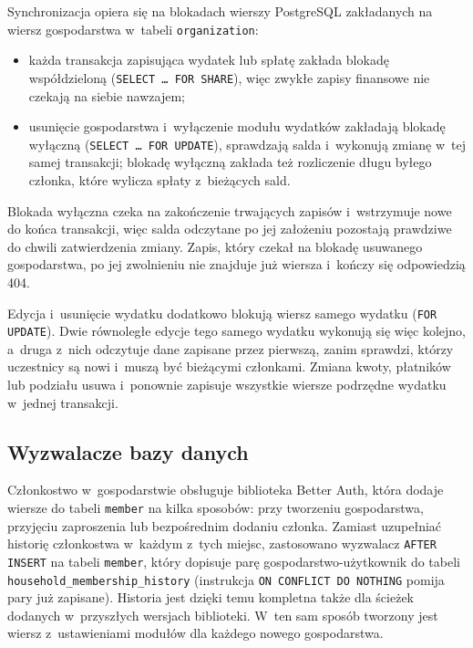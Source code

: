 Synchronizacja opiera się na blokadach wierszy PostgreSQL zakładanych na wiersz gospodarstwa w~tabeli \texttt{organization}:

\begin{itemize}
  \item każda transakcja zapisująca wydatek lub spłatę zakłada blokadę współdzieloną (\texttt{SELECT \dots{} FOR SHARE}), więc zwykłe zapisy finansowe nie czekają na siebie nawzajem;
  \item usunięcie gospodarstwa i~wyłączenie modułu wydatków zakładają blokadę wyłączną (\texttt{SELECT \dots{} FOR UPDATE}), sprawdzają salda i~wykonują zmianę w~tej samej transakcji; blokadę wyłączną zakłada też rozliczenie długu byłego członka, które wylicza spłaty z~bieżących sald.
\end{itemize}

Blokada wyłączna czeka na zakończenie trwających zapisów i~wstrzymuje nowe do końca transakcji, więc salda odczytane po jej założeniu pozostają prawdziwe do chwili zatwierdzenia zmiany. Zapis, który czekał na blokadę usuwanego gospodarstwa, po jej zwolnieniu nie znajduje już wiersza i~kończy się odpowiedzią 404.

Edycja i~usunięcie wydatku dodatkowo blokują wiersz samego wydatku (\texttt{FOR UPDATE}). Dwie równoległe edycje tego samego wydatku wykonują się więc kolejno, a~druga z~nich odczytuje dane zapisane przez pierwszą, zanim sprawdzi, którzy uczestnicy są nowi i~muszą być bieżącymi członkami. Zmiana kwoty, płatników lub podziału usuwa i~ponownie zapisuje wszystkie wiersze podrzędne wydatku w~jednej transakcji.

\subsection{Wyzwalacze bazy danych}

Członkostwo w~gospodarstwie obsługuje biblioteka Better Auth, która dodaje wiersze do tabeli \texttt{member} na kilka sposobów: przy tworzeniu gospodarstwa, przyjęciu zaproszenia lub bezpośrednim dodaniu członka. Zamiast uzupełniać historię członkostwa w~każdym z~tych miejsc, zastosowano wyzwalacz \texttt{AFTER INSERT} na tabeli \texttt{member}, który dopisuje parę gospodarstwo-użytkownik do tabeli \texttt{household\_membership\_history} (instrukcja \texttt{ON CONFLICT DO NOTHING} pomija pary już zapisane). Historia jest dzięki temu kompletna także dla ścieżek dodanych w~przyszłych wersjach biblioteki. W~ten sam sposób tworzony jest wiersz z~ustawieniami modułów dla każdego nowego gospodarstwa.

